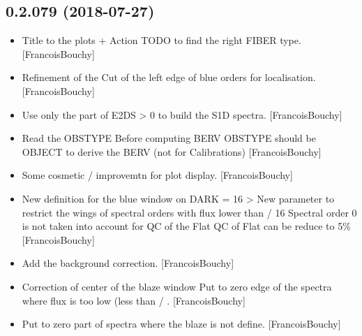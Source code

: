 \documentclass[a4paper,10pt,english]{report}
\begin{document}
\subsection{0.2.079 (2018-07-27)}
\label{\detokenize{misc/changelog:id383}}\begin{itemize}
\item {} 
Title to the plots + Action TODO to find the right FIBER type.
{[}FrancoisBouchy{]}

\item {} 
Refinement of the Cut of the left edge of blue orders for
localisation. {[}FrancoisBouchy{]}

\item {} 
Use only the part of E2DS \textgreater{} 0 to build the S1D spectra.
{[}FrancoisBouchy{]}

\item {} 
Read the OBSTYPE Before computing BERV OBSTYPE should be OBJECT to
derive the BERV (not for Calibrations) {[}FrancoisBouchy{]}

\item {} 
Some cosmetic / improvemtn for plot display. {[}FrancoisBouchy{]}

\item {} 
New definition for the blue window on DARK  = 16 \textendash{}\textgreater{}
New parameter to restrict the wings of spectral orders with flux lower
than  / 16 Spectral order 0 is not taken into account for
QC of the Flat QC of Flat can be reduce to 5\% {[}FrancoisBouchy{]}

\item {} 
Add the background correction. {[}FrancoisBouchy{]}

\item {} 
Correction of center of the blaze window Put to zero edge of the
spectra where flux is too low (less than  /
. {[}FrancoisBouchy{]}

\item {} 
Put to zero part of spectra where the blaze is not define.
{[}FrancoisBouchy{]}

\end{itemize}
\end{document}
